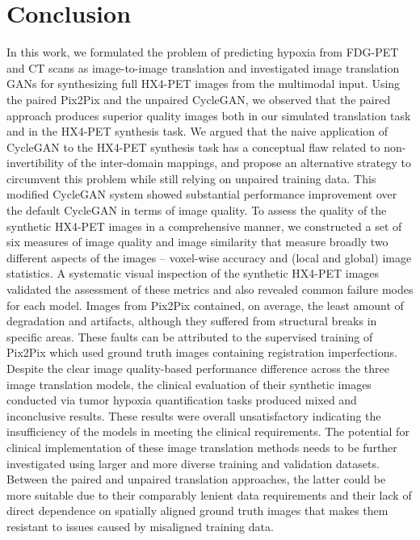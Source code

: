 \chapter{Conclusion}
\label{Conclusion}

In this work, we formulated the problem of predicting hypoxia from FDG-PET and CT scans as image-to-image translation and investigated image translation GANs for synthesizing full HX4-PET images from the multimodal input. Using the paired Pix2Pix and the unpaired CycleGAN, we observed that the paired approach produces superior quality images both in our simulated translation task and in the HX4-PET synthesis task. We argued that the naive application of CycleGAN to the HX4-PET synthesis task has a conceptual flaw related to non-invertibility of the inter-domain mappings, and propose an alternative strategy to circumvent this problem while still relying on unpaired training data. This modified CycleGAN system showed substantial performance improvement over the default CycleGAN in terms of image quality. To assess the quality of the synthetic HX4-PET images in a comprehensive manner, we constructed a set of six measures of image quality and image similarity that measure broadly two different aspects of the images -- voxel-wise accuracy and (local and global) image statistics. A systematic visual inspection of the synthetic HX4-PET images validated the assessment of these metrics and also revealed common failure modes for each model. Images from Pix2Pix contained, on average, the least amount of degradation and artifacts, although they suffered from structural breaks in specific areas. These faults can be attributed to the supervised training of Pix2Pix which used ground truth images containing registration imperfections. Despite the clear image quality-based performance difference across the three image translation models, the clinical evaluation of their synthetic images conducted via tumor hypoxia quantification tasks produced mixed and inconclusive results. These results were overall unsatisfactory indicating the insufficiency of the models in meeting the clinical requirements. The potential for clinical implementation of these image translation methods needs to be further investigated using larger and more diverse training and validation datasets. Between the paired and unpaired translation approaches, the latter could be more suitable due to their comparably lenient data requirements and their lack of direct dependence on spatially aligned ground truth images that makes them resistant to issues caused by misaligned training data.